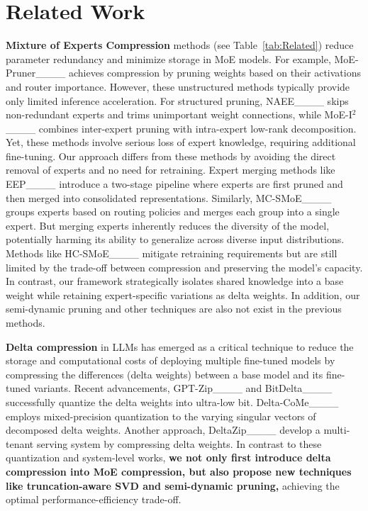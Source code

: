 \section{Related Work}
\label{sec:related_works}

\textbf{Mixture of Experts Compression} methods (see Table~\ref{tab:Related}) reduce parameter redundancy and minimize storage in MoE models. For example,  MoE-Pruner____ achieves compression by pruning weights based on their activations and router importance. However, these unstructured methods typically provide only limited inference acceleration. For structured pruning, NAEE____ skips non-redundant experts and trims unimportant weight connections, while MoE-I$^2$____ combines inter-expert pruning with intra-expert low-rank decomposition. Yet, these methods involve serious loss of expert knowledge, requiring additional fine-tuning. Our approach differs from these methods by avoiding the direct removal of experts and no need for retraining. Expert merging methods like EEP____ introduce a two-stage pipeline where experts are first pruned and then merged into consolidated representations. Similarly, MC-SMoE____ groups experts based on routing policies and merges each group into a single expert. But  merging experts inherently reduces the diversity of the model, potentially harming its ability to generalize across diverse input distributions. Methods like HC-SMoE____ mitigate retraining requirements but are still limited by the trade-off between compression and preserving the model's capacity. In contrast, our framework strategically isolates shared knowledge into a base weight while retaining expert-specific variations as delta weights.  In addition, our semi-dynamic pruning and other techniques are also not exist in the previous methods.


\textbf{Delta compression} in LLMs has emerged as a critical technique to reduce the storage and computational costs of deploying multiple fine-tuned models by compressing the differences (delta weights) between a base model and its fine-tuned variants. Recent advancements, GPT-Zip____ and BitDelta____  successfully quantize the delta weights into ultra-low bit. Delta-CoMe____ employs mixed-precision quantization to the varying singular vectors of decomposed delta weights. Another approach, DeltaZip____ develop a multi-tenant serving system by compressing delta weights. In contrast to these quantization and system-level works, \textbf{we not only first introduce delta compression into MoE compression, but also propose new techniques like truncation-aware SVD and semi-dynamic pruning,} achieving the optimal performance-efficiency trade-off.






